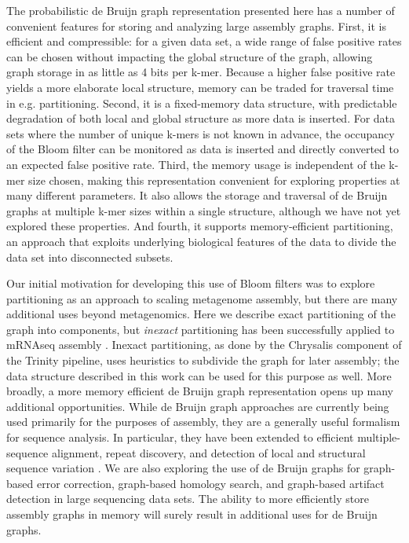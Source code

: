 \documentclass{pnastwo}
\begin{document}
\begin{article}
The probabilistic de Bruijn graph representation presented here has a
number of convenient features for storing and analyzing large assembly
graphs.  First, it is efficient and compressible: for a given data
set, a wide range of false positive rates can be chosen without
impacting the global structure of the graph, allowing graph storage in
as little as 4 bits per k-mer.  Because a higher false positive rate
yields a more elaborate local structure, memory can be traded for
traversal time in e.g. partitioning.  Second, it is a fixed-memory
data structure, with predictable degradation of both local and global
structure as more data is inserted.  For data sets where the number of
unique k-mers is not known in advance, the occupancy of the Bloom
filter can be monitored as data is inserted and directly converted to
an expected false positive rate.  Third, the memory usage is
independent of the k-mer size chosen, making this representation
convenient for exploring properties at many different parameters.  It
also allows the storage and traversal of de Bruijn graphs at multiple
k-mer sizes within a single structure, although we have not yet
explored these properties.  And fourth, it supports memory-efficient
partitioning, an approach that exploits underlying biological features
of the data to divide the data set into disconnected subsets.

Our initial motivation for developing this use of Bloom filters was to
explore partitioning as an approach to scaling metagenome assembly,
but there are many additional uses beyond metagenomics.  Here we
describe exact partitioning of the graph into components, but {\em
  inexact} partitioning has been successfully applied to mRNAseq
assembly \cite{trinity}.  Inexact partitioning, as done by the
Chrysalis component of the Trinity pipeline, uses heuristics to
subdivide the graph for later assembly; the data structure described
in this work can be used for this purpose as well.  More broadly, a
more memory efficient de Bruijn graph representation opens up many
additional opportunities.  While de Bruijn graph approaches are
currently being used primarily for the purposes of assembly, they are
a generally useful formalism for sequence analysis. In particular,
they have been extended to efficient multiple-sequence alignment,
repeat discovery, and detection of local and structural sequence
variation \cite{zerbinothesis,zhang2003dna,price2005novo}.
We are also exploring the use of de Bruijn graphs for graph-based
error correction, graph-based homology search, and graph-based
artifact detection in large sequencing data sets.  The ability to more
efficiently store assembly graphs in memory will surely result in
additional uses for de Bruijn graphs.


\end{article}
\end{document}
